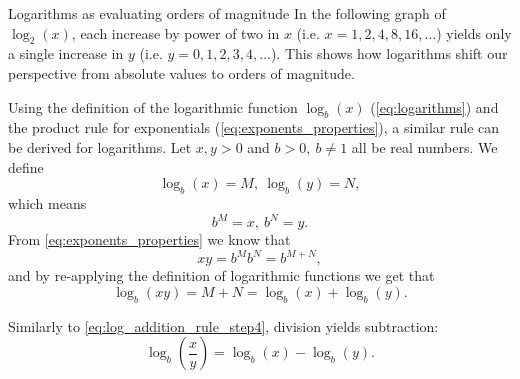 \begin{example}{Logarithms as evaluating orders of magnitude}{}
	In the following graph of $\log_{2}(x)$, each increase by power of two in $x$ (i.e. $x=1,2,4,8,16,\dots$) yields only a single increase in $y$ (i.e. $y=0,1,2,3,4,\dots$). This shows how logarithms shift our perspective from absolute values to orders of magnitude.
	\begin{figure}[H]
		\centering
	\end{figure}
\end{example}

Using the definition of the logarithmic function $\log_{b}(x)$ (\autoref{eq:logarithms}) and the product rule for exponentials (\autoref{eq:exponents_properties}), a similar rule can be derived for logarithms. Let $x,y>0$ and $b>0,\ b\neq1$ all be real numbers. We define
\begin{equation}
	\log_{b}(x)=M,\ \log_{b}(y)=N,
	\label{eq:log_addition_rule_step1}
\end{equation}
which means
\begin{equation}
	b^{M}=x,\ b^{N}=y.
	\label{eq:log_addition_rule_step2}
\end{equation}
From \autoref{eq:exponents_properties} we know that
\begin{equation}
	xy = b^{M}b^{N} = b^{M+N},
	\label{eq:log_addition_rule_step3}
\end{equation}
and by re-applying the definition of logarithmic functions we get that
\begin{equation}
	\log_{b}(xy) = M+N = \log_{b}(x) + \log_{b}(y).
	\label{eq:log_addition_rule_step4}
\end{equation}

Similarly to \autoref{eq:log_addition_rule_step4}, division yields subtraction:
\begin{equation}
	\log_{b}\left(\frac{x}{y}\right) = \log_{b}(x)-\log_{b}(y).
	\label{eq:log_subtraction_rule}
\end{equation}

